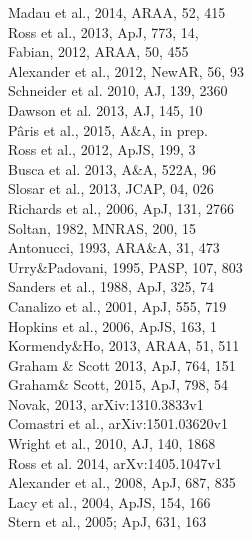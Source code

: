 \documentclass[oneside, a4paper, onecolumn, 11pt]{article}
\begin{document}
\begin{multicols}{3}[]
\noindent
\scriptsize
{}\rbrack Madau et al., 2014, ARAA, 52, 415\\
\rbrack Ross et al., 2013, ApJ, 773, 14, \\
\rbrack Fabian, 2012, ARAA, 50, 455 \\
\rbrack Alexander et al., 2012, NewAR, 56, 93\\
\rbrack Schneider et al. 2010, AJ, 139, 2360\\
\rbrack Dawson et al. 2013, AJ, 145, 10\\
\rbrack P\^{a}ris et al., 2015, A\&A, in prep. \\
\rbrack Ross et al., 2012, ApJS, 199, 3\\
\rbrack Busca et al. 2013, A\&A, 522A, 96 \\
\rbrack Slosar et al., 2013, JCAP, 04, 026 \\
\rbrack Richards et al., 2006, ApJ, 131, 2766\\
\rbrack Soltan, 1982, MNRAS, 200, 15\\
\rbrack Antonucci, 1993, ARA\&A, 31, 473\\
\rbrack Urry\&Padovani, 1995, PASP, 107, 803\\
\rbrack Sanders et al., 1988, ApJ, 325, 74\\
\rbrack Canalizo et al., 2001, ApJ, 555, 719 \\
\rbrack Hopkins et al., 2006, ApJS, 163, 1\\
\rbrack Kormendy\&Ho, 2013, ARAA, 51, 511\\
\rbrack Graham \& Scott 2013, ApJ, 764, 151 \\
\rbrack Graham\& Scott, 2015, ApJ, 798, 54 \\
\rbrack Novak, 2013, arXiv:1310.3833v1\\
\rbrack Comastri et al., arXiv:1501.03620v1\\
\rbrack Wright et al., 2010, AJ, 140, 1868\\
\rbrack Ross et al. 2014, arXv:1405.1047v1\\
\rbrack Alexander et al., 2008, ApJ, 687, 835 \\
\rbrack Lacy et al., 2004, ApJS, 154, 166\\
\rbrack Stern et al., 2005; ApJ, 631, 163 \\

\end{multicols}
\end{document}
